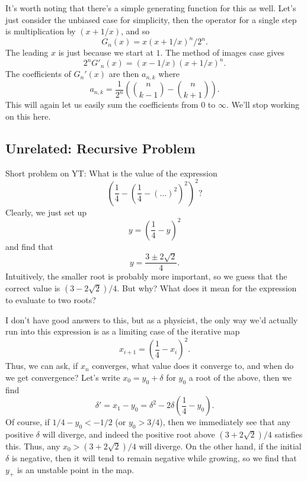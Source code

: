 \documentclass[12pt]{report}
\newcommand*{\p}[1]{\left(#1\right)}
\begin{document}
It's worth noting that there's a simple generating function for this as well.
Let's just consider the unbiased case for simplicity, then the operator for a
single step is multiplication by $(x + 1/x)$, and so
\begin{equation}
    G_n(x) = x\p{x + 1/x}^n/2^n.
\end{equation}
The leading $x$ is just because we start at $1$. The method of images case gives
\begin{equation}
    2^nG'_n(x) = \p{x - 1/x}\p{x + 1/x}^n.
\end{equation}
The coefficients of $G_n'(x)$ are then $a_{n, k}$ where
\begin{equation}
    a_{n, k} = \frac{1}{2^n}\p{\binom{n}{k - 1} - \binom{n}{k + 1}}.
\end{equation}
This will again let us easily sum the coefficients from $0$ to $\infty$. We'll
stop working on this here.

\subsection{Unrelated: Recursive Problem}

Short problem on YT\@: What is the value of the expression
\begin{equation}
    \p{\frac{1}{4} - \p{\frac{1}{4} - \p{\dots}^2}^2}^2?
\end{equation}
Clearly, we just set up
\begin{equation}
    y = \p{\frac{1}{4} - y}^2
\end{equation}
and find that
\begin{equation}
    y = \frac{3 \pm 2\sqrt{2}}{4}.
\end{equation}
Intuitively, the smaller root is probably more important, so we guess that the
correct value is $(3 - 2\sqrt{2}) / 4$. But why? What does it mean for the
expression to evaluate to two roots?

I don't have good answers to this, but as a physicist, the only way we'd
actually run into this expression is as a limiting case of the iterative map
\begin{equation}
    x_{i + 1} = \p{\frac{1}{4} - x_i}^2.
\end{equation}
Thus, we can ask, if $x_n$ converges, what value does it converge to, and when
do we get convergence? Let's write $x_0 = y_0 + \delta$ for $y_0$ a root of the
above, then we find
\begin{equation}
    \delta' = x_1 - y_0 = \delta^2 - 2\delta\p{\frac{1}{4} - y_0}.
\end{equation}
Of course, if $1/4 - y_0 < -1/2$ (or $y_0 > 3/4$), then we immediately see that
any positive $\delta$ will diverge, and indeed the positive root above $(3 +
2\sqrt{2}) / 4$ satisfies this. Thus, any $x_0 > (3 + 2\sqrt{2}) / 4$ will
diverge. On the other hand, if the initial $\delta$ is negative, then it will
tend to remain negative while growing, so we find that $y_+$ is an unstable
point in the map.
\end{document}
